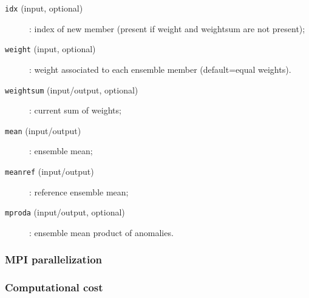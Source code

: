 \documentclass[11pt]{article}
\begin{document}
\begin{description}
\begin{description}
  \item[{\tt idx} (input, optional)]: index of new member
                                      (present if weight and weightsum are not present);
  \item[{\tt weight} (input, optional)]: weight associated to each ensemble member
                                         (default=equal weights).
  \item[{\tt weightsum} (input/output, optional)]: current sum of weights;
  \item[{\tt mean} (input/output)]: ensemble mean;
  \item[{\tt meanref} (input/output)]: reference ensemble mean;
  \item[{\tt mproda} (input/output, optional)]: ensemble mean product of anomalies.
  \end{description}
\end{description}

\subsubsection*{MPI parallelization}

\subsubsection*{Computational cost}
\end{document}
